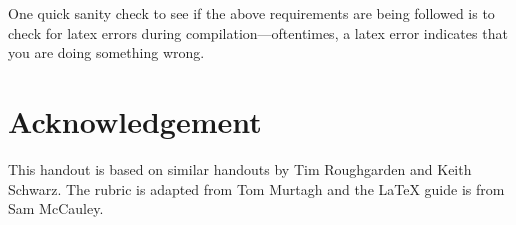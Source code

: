\documentclass{article}
\theoremstyle{definition}
\begin{document}
One quick sanity check to see if the above requirements are being followed is to check for latex errors during compilation---oftentimes, a latex error indicates that you are doing something wrong.




\section*{Acknowledgement}
This handout is based on similar handouts by Tim Roughgarden and Keith Schwarz.  The rubric is adapted from Tom Murtagh and the LaTeX guide is from Sam McCauley.
\end{document}
